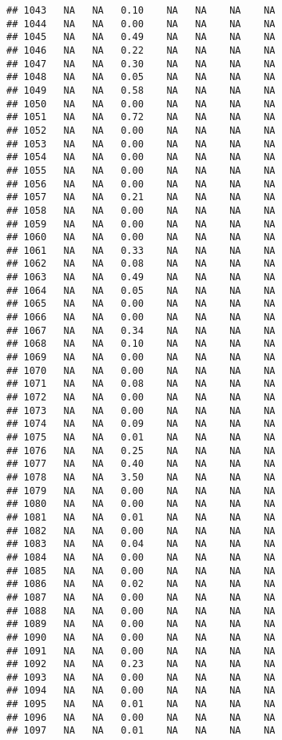 \documentclass{article}\usepackage{graphicx, color}
\makeatletter
\newenvironment{kframe}{%
 \def\at@end@of@kframe{}%
 \ifinner\ifhmode%
  \def\at@end@of@kframe{\end{minipage}}%
  \begin{minipage}{\columnwidth}%
 \fi\fi%
 \def\FrameCommand##1{\hskip\@totalleftmargin \hskip-\fboxsep
 \colorbox{shadecolor}{##1}\hskip-\fboxsep
     \hskip-\linewidth \hskip-\@totalleftmargin \hskip\columnwidth}%
 \MakeFramed {\advance\hsize-\width
   \@totalleftmargin\z@ \linewidth\hsize
   \@setminipage}}%
 {\par\unskip\endMakeFramed%
 \at@end@of@kframe}
\newenvironment{knitrout}{}{} %
\makeatother
\begin{document}
\begin{knitrout}
\begin{kframe}
\begin{verbatim}
## 1043   NA   NA   0.10    NA   NA    NA    NA
## 1044   NA   NA   0.00    NA   NA    NA    NA
## 1045   NA   NA   0.49    NA   NA    NA    NA
## 1046   NA   NA   0.22    NA   NA    NA    NA
## 1047   NA   NA   0.30    NA   NA    NA    NA
## 1048   NA   NA   0.05    NA   NA    NA    NA
## 1049   NA   NA   0.58    NA   NA    NA    NA
## 1050   NA   NA   0.00    NA   NA    NA    NA
## 1051   NA   NA   0.72    NA   NA    NA    NA
## 1052   NA   NA   0.00    NA   NA    NA    NA
## 1053   NA   NA   0.00    NA   NA    NA    NA
## 1054   NA   NA   0.00    NA   NA    NA    NA
## 1055   NA   NA   0.00    NA   NA    NA    NA
## 1056   NA   NA   0.00    NA   NA    NA    NA
## 1057   NA   NA   0.21    NA   NA    NA    NA
## 1058   NA   NA   0.00    NA   NA    NA    NA
## 1059   NA   NA   0.00    NA   NA    NA    NA
## 1060   NA   NA   0.00    NA   NA    NA    NA
## 1061   NA   NA   0.33    NA   NA    NA    NA
## 1062   NA   NA   0.08    NA   NA    NA    NA
## 1063   NA   NA   0.49    NA   NA    NA    NA
## 1064   NA   NA   0.05    NA   NA    NA    NA
## 1065   NA   NA   0.00    NA   NA    NA    NA
## 1066   NA   NA   0.00    NA   NA    NA    NA
## 1067   NA   NA   0.34    NA   NA    NA    NA
## 1068   NA   NA   0.10    NA   NA    NA    NA
## 1069   NA   NA   0.00    NA   NA    NA    NA
## 1070   NA   NA   0.00    NA   NA    NA    NA
## 1071   NA   NA   0.08    NA   NA    NA    NA
## 1072   NA   NA   0.00    NA   NA    NA    NA
## 1073   NA   NA   0.00    NA   NA    NA    NA
## 1074   NA   NA   0.09    NA   NA    NA    NA
## 1075   NA   NA   0.01    NA   NA    NA    NA
## 1076   NA   NA   0.25    NA   NA    NA    NA
## 1077   NA   NA   0.40    NA   NA    NA    NA
## 1078   NA   NA   3.50    NA   NA    NA    NA
## 1079   NA   NA   0.00    NA   NA    NA    NA
## 1080   NA   NA   0.00    NA   NA    NA    NA
## 1081   NA   NA   0.01    NA   NA    NA    NA
## 1082   NA   NA   0.00    NA   NA    NA    NA
## 1083   NA   NA   0.04    NA   NA    NA    NA
## 1084   NA   NA   0.00    NA   NA    NA    NA
## 1085   NA   NA   0.00    NA   NA    NA    NA
## 1086   NA   NA   0.02    NA   NA    NA    NA
## 1087   NA   NA   0.00    NA   NA    NA    NA
## 1088   NA   NA   0.00    NA   NA    NA    NA
## 1089   NA   NA   0.00    NA   NA    NA    NA
## 1090   NA   NA   0.00    NA   NA    NA    NA
## 1091   NA   NA   0.00    NA   NA    NA    NA
## 1092   NA   NA   0.23    NA   NA    NA    NA
## 1093   NA   NA   0.00    NA   NA    NA    NA
## 1094   NA   NA   0.00    NA   NA    NA    NA
## 1095   NA   NA   0.01    NA   NA    NA    NA
## 1096   NA   NA   0.00    NA   NA    NA    NA
## 1097   NA   NA   0.01    NA   NA    NA    NA

\end{verbatim}
\end{kframe}
\end{knitrout}
\end{document}
